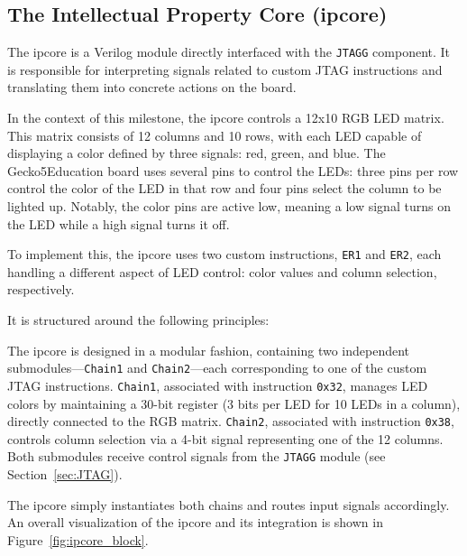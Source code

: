 \documentclass[a4paper,11pt,oneside]{report}
\newcommand{\boardName}{Gecko5Education \xspace}
\begin{document}
\subsection{The Intellectual Property Core (ipcore)}

The ipcore is a Verilog module directly interfaced with the \texttt{JTAGG} component. 
It is responsible for interpreting signals related to custom JTAG instructions and translating them into concrete actions on the board.

In the context of this milestone, the ipcore controls a 12x10 RGB LED matrix.
This matrix consists of 12 columns and 10 rows, with each LED capable of displaying a color defined by three signals: red, green, and blue. The \boardName board uses several pins
 to control the LEDs: three pins per row control the color of the LED in that row and four pins select the column to be lighted up.  
Notably, the color pins are active low, meaning a low signal turns on the LED while a high signal turns it off.

To implement this, the ipcore uses two custom instructions, \texttt{ER1} and \texttt{ER2}, each handling a different aspect of LED control: color values and column selection, respectively.

It is structured around the following principles:

The ipcore is designed in a  modular fashion, containing two independent submodules—\texttt{Chain1} and \texttt{Chain2}—each corresponding to one of the custom JTAG instructions.  
\texttt{Chain1}, associated with instruction \texttt{0x32}, manages LED colors by maintaining a 30-bit register (3 bits per LED for 10 LEDs in a column), directly connected to the RGB matrix.  
\texttt{Chain2}, associated with instruction \texttt{0x38}, controls column selection via a 4-bit signal representing one of the 12 columns.  
Both submodules receive control signals from the \texttt{JTAGG} module (see Section~\ref{sec:JTAG}).  

The ipcore simply instantiates both chains and routes input signals accordingly. An overall visualization of the ipcore and its integration is shown in Figure~\ref{fig:ipcore_block}.
\end{document}
